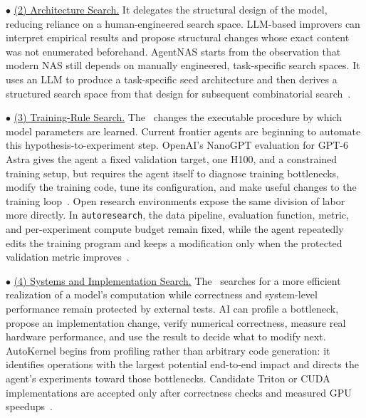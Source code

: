 \noindent$\bullet$ \underline{(2) {Architecture Search.}}
It delegates the structural design of the model, reducing reliance on a human-engineered search space.
LLM-based improvers can interpret empirical results and propose structural changes whose exact content was not enumerated beforehand. %
AgentNAS starts from the observation that modern NAS still depends on manually engineered, task-specific search spaces. It uses an LLM to produce a task-specific seed architecture and then derives a structured search space from that design for subsequent combinatorial search~\cite{jeong2026agentnas}.


\noindent$\bullet$ \underline{(3) {Training-Rule Search.}}
The \Improver\ changes the executable procedure by which model parameters are learned.
Current frontier agents are beginning to automate this hypothesis-to-experiment step. OpenAI's NanoGPT evaluation for GPT-6 Astra gives the agent a fixed validation target, one H100, and a constrained training setup, but requires the agent itself to diagnose training bottlenecks, modify the training code, tune its configuration, and make useful changes to the training loop~\cite{openai2026gpt6astra}.
Open research environments expose the same division of labor more directly. In \texttt{autoresearch}, the data pipeline, evaluation function, metric, and per-experiment compute budget remain fixed, while the agent repeatedly edits the training program and keeps a modification only when the protected validation metric improves~\cite{karpathy2026autoresearch}.

\noindent$\bullet$ \underline{(4) {Systems and Implementation Search.}}
The \Improver \ searches for a more efficient realization of a model's computation while correctness and system-level performance remain protected by external tests.
AI can profile a bottleneck, propose an implementation change, verify numerical correctness, measure real hardware performance, and use the result to decide what to modify next.
AutoKernel begins from profiling rather than arbitrary code generation: it identifies operations with the largest potential end-to-end impact and directs the agent's experiments toward those bottlenecks. Candidate Triton or CUDA implementations are accepted only after correctness checks and measured GPU speedups~\cite{jaber2026autokernel}.


